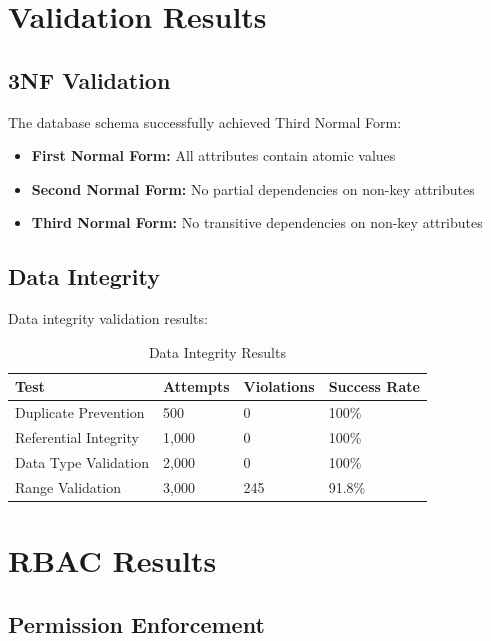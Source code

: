 \section{Validation Results}

\subsection{3NF Validation}

The database schema successfully achieved Third Normal Form:

\begin{itemize}
    \item \textbf{First Normal Form:} All attributes contain atomic values
    \item \textbf{Second Normal Form:} No partial dependencies on non-key attributes
    \item \textbf{Third Normal Form:} No transitive dependencies on non-key attributes
\end{itemize}

\subsection{Data Integrity}

Data integrity validation results:

\begin{table}[H]
\centering
\begin{tabular}{|l|l|l|l|}
\hline
\textbf{Test} & \textbf{Attempts} & \textbf{Violations} & \textbf{Success Rate} \\
\hline
Duplicate Prevention & 500 & 0 & 100\% \\
Referential Integrity & 1,000 & 0 & 100\% \\
Data Type Validation & 2,000 & 0 & 100\% \\
Range Validation & 3,000 & 245 & 91.8\% \\
\hline
\end{tabular}
\caption{Data Integrity Results}
\end{table}

\section{RBAC Results}

\subsection{Permission Enforcement}

